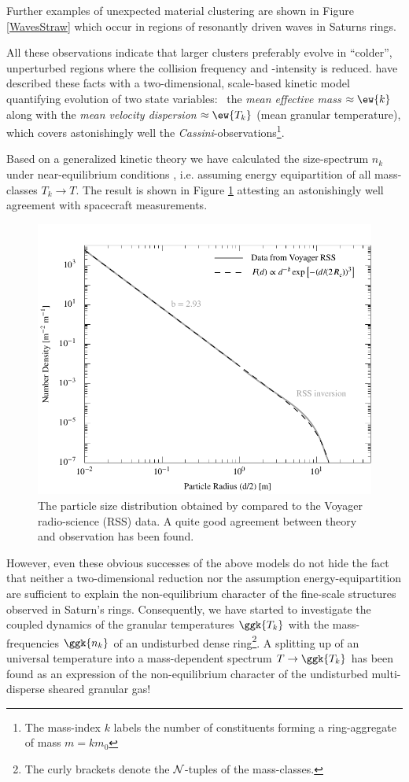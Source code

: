 \documentclass[11pt, notitlepage]{article} %
\begin{document}
Further examples of unexpected material clustering are shown in Figure \ref{WavesStraw} which occur in regions of resonantly driven 
waves in Saturns rings. 

All these observations indicate that larger clusters preferably evolve in ``colder'', unperturbed regions where the collision frequency and
-intensity is reduced. \citet{esposito2012} have described these facts with a two-dimensional, scale-based kinetic model quantifying
evolution of two state variables: \, the  \emph{mean effective mass} $\approx \ew{k}$ along with the \emph{mean velocity dispersion} 
$\approx \ew{T_k}$  (mean granular temperature), which covers astonishingly well the \emph{Cassini}-observations\footnote{The mass-index
$k$ labels the number of constituents forming a ring-aggregate of mass $m = k m_0$}.

Based on a generalized kinetic theory \citep{spahn2004,spahn2014} we have calculated the size-spectrum $n_k$ under near-equilibrium
conditions \citep{Brilliantov2015}, i.e.  assuming energy equipartition of all mass-classes $T_k \rightarrow T$. The result is shown 
in Figure \ref{SizesDF} attesting an astonishingly well agreement with spacecraft measurements. 
\begin{figure}[ht]
	\centerline{
	\includegraphics[width=.5\textwidth]{Figures/sdfa219b}
	}
	\caption{\small
The particle size distribution obtained by \citet{Brilliantov2015} compared to the Voyager radio-science (RSS) data.
A quite good agreement between theory and observation has been found.}
\label{SizesDF}
\end{figure}
\sap

However, even these obvious successes of the above models do not hide the fact that neither a two-dimensional
reduction \citep{esposito2012} nor the assumption energy-equipartition \citep{spahn2004,Brilliantov2015} are sufficient
to explain the non-equilibrium character of the fine-scale structures observed in Saturn's rings. Consequently, we
have started to investigate the coupled dynamics of the granular temperatures $\ggk{T_k}$ with the 
mass-frequencies $\ggk{n_k}$ of an undisturbed dense ring\footnote{The curly brackets denote the ${\cal N}$-tuples
of the mass-classes.}. A splitting up of an universal temperature into a mass-dependent spectrum $T \rightarrow \ggk{T_k}$
has been found as an expression of the non-equilibrium character of the undisturbed multi-disperse sheared granular gas!
\end{document}
